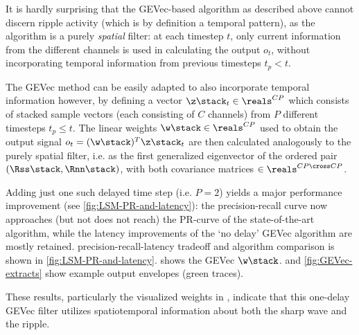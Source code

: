 \label{sec:spatiotemporal}

It is hardly surprising that the GEVec-based algorithm as described above cannot discern ripple activity (which is by definition a temporal pattern), as the algorithm is a purely \emph{spatial} filter: at each timestep $t$, only current information from the different channels is used in calculating the output $o_t$, without incorporating temporal information from previous timesteps $t_p < t$.

The GEVec method can be easily adapted to also incorporate temporal information however, by defining a vector $\z\stack_t \in \reals^{CP}$ which consists of stacked sample vectors (each consisting of $C$ channels) from $P$ different timesteps $t_p \leq t$. The linear weights $\w\stack \in \reals^{CP}$ used to obtain the output signal $o_t = (\w\stack)^T \z\stack_t$ are then calculated analogously to the purely spatial filter, i.e. as the first generalized eigenvector of the ordered pair $(\Rss\stack, \Rnn\stack)$, with both covariance matrices $\in \reals^{CP \cross CP}$.

Adding just one such delayed time step (i.e. $P = 2$) yields a major performance improvement (see \cref{fig:LSM-PR-and-latency}): the precision-recall curve now approaches (but not does not reach) the PR-curve of the state-of-the-art algorithm, while the latency improvements of the `no delay' GEVec algorithm are mostly retained. precision-recall-latency tradeoff and algorithm comparison is shown in \cref{fig:LSM-PR-and-latency}.  shows the GEVec $\w\stack$.  and \cref{fig:GEVec-extracts} show example output envelopes (green traces).

These results, particularly the visualized weights in , indicate that this one-delay GEVec filter utilizes spatiotemporal information about both the sharp wave and the ripple.
